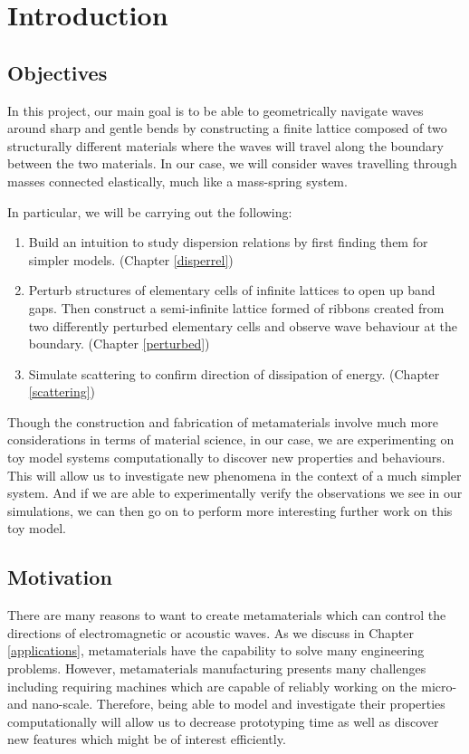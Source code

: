 \chapter{Introduction}

\section{Objectives}
In this project, our main goal is to be able to geometrically navigate waves
around sharp and gentle bends by constructing a finite lattice composed of two
structurally different materials where the waves will travel along the boundary
between the two materials. In our case, we will consider waves travelling
through masses connected elastically, much like a mass-spring system.

In particular, we will be carrying out the following:

\begin{enumerate}
\item Build an intuition to study dispersion relations by first finding them
      for simpler models. (Chapter \ref{disperrel})
\item Perturb structures of elementary cells of infinite lattices to open up
      band gaps. Then construct a semi-infinite lattice formed of ribbons
      created from two differently perturbed elementary cells and observe wave
      behaviour at the boundary. (Chapter \ref{perturbed})
\item Simulate scattering to confirm direction of dissipation of energy.
      (Chapter \ref{scattering})
\end{enumerate}

Though the construction and fabrication of metamaterials involve much more
considerations in terms of material science, in our case, we are experimenting
on toy model systems computationally to discover new properties and behaviours.
This will allow us to investigate new phenomena in the context of a much
simpler system. And if we are able to experimentally verify the observations we
see in our simulations, we can then go on to perform more interesting further
work on this toy model.

\section{Motivation}
There are many reasons to want to create metamaterials which can control the
directions of electromagnetic or acoustic waves. As we discuss in Chapter
\ref{applications}, metamaterials have the capability to solve many engineering
problems. However, metamaterials manufacturing presents many challenges
including requiring machines which are capable of reliably working on the
micro- and nano-scale.\cite{metamanu} Therefore, being able to model and
investigate their properties computationally will allow us to decrease
prototyping time as well as discover new features which might be of interest
efficiently.
